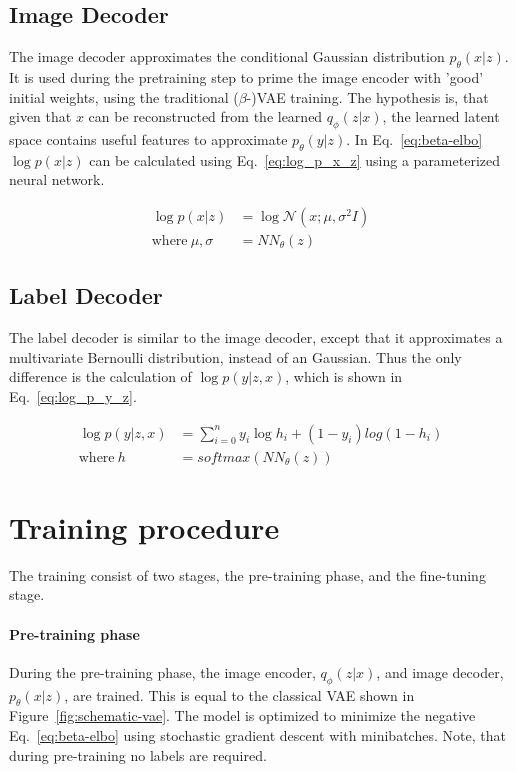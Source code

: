 \subsection{Image Decoder}
The image decoder approximates the conditional Gaussian distribution $p_\theta(x|z)$. It is used during the pretraining step to prime the image encoder with 'good' initial weights, using the traditional ($\beta$-)VAE training. The hypothesis is, that given that $x$ can be reconstructed from the learned $q_\phi(z|x)$, the learned latent space contains useful features to approximate $p_\theta(y|z)$. In Eq.~\ref{eq:beta-elbo} $\log p(x|z)$ can be calculated using Eq.~\ref{eq:log_p_x_z} using a parameterized neural network.

\begin{equation}
    \begin{split}
        \log p(x|z)             & = \log \mathcal{N}(x; \mu, \sigma^2I) \label{eq:log_p_x_z} \\
        \text{where}~\mu,\sigma & =NN_\theta(z)
    \end{split}
\end{equation}

\subsection{Label Decoder}
The label decoder is similar to the image decoder, except that it approximates a multivariate Bernoulli distribution, instead of an Gaussian. Thus the only difference is the calculation of $\log p(y|z,x)$, which is shown in Eq.~\ref{eq:log_p_y_z}.

\begin{subequations}
    \begin{align}
        \log p(y|z, x) & = \sum_{i=0}^n y_i \log h_i + (1 - y_i)log(1-h_i) \label{eq:log_p_y_z} \\
        \text{where}~h & = softmax(NN_\theta(z))
    \end{align}
\end{subequations}

\section{Training procedure}
The training consist of two stages, the pre-training phase, and the fine-tuning stage. 
\paragraph*{Pre-training phase} During the pre-training phase, the image encoder, $q_\phi(z|x)$, and image decoder, $p_\theta(x|z)$, are trained. This is equal to the classical VAE shown in Figure~\ref{fig:schematic-vae}. The model is optimized to minimize the negative Eq.~\ref{eq:beta-elbo} using stochastic gradient descent with minibatches. Note, that during pre-training no labels are required.

